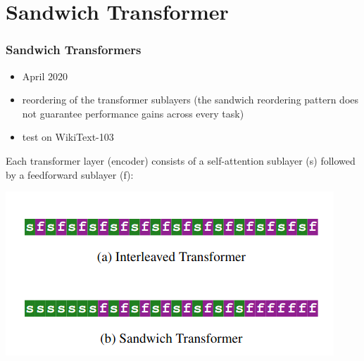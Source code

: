 \documentclass{beamer}
\begin{document}
\section{Sandwich Transformer}
\begin{frame}
    \frametitle{Sandwich Transformers \cite{sandwich_transformers}}
    \begin{itemize}
        \item April 2020
        \item reordering of the transformer sublayers (the sandwich reordering pattern does not guarantee performance gains across every task)
        \item test on WikiText-103
    \end{itemize}
    Each transformer layer (encoder) consists of a self-attention sublayer (s) followed by a feedforward sublayer (f):
    \begin{center}
        \includegraphics[scale=0.38]{img/sandwich_transformers.png}
    \end{center}
\end{frame}
\end{document}
